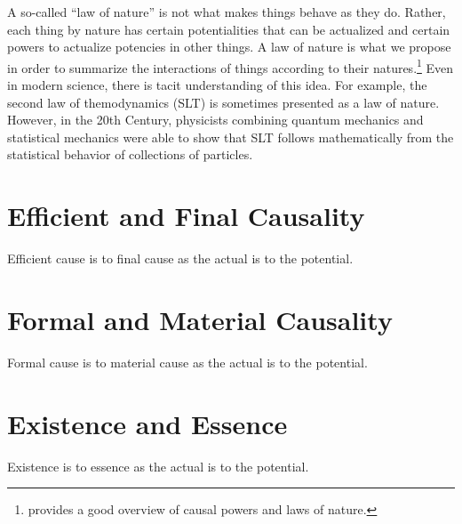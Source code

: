 \documentclass[twocolumn]{article}
\begin{document}
A so-called ``law of nature'' is not what makes things behave as they do.
Rather, each thing by nature has certain potentialities that can be actualized
and certain powers to actualize potencies in other things.  A law of nature is
what we propose in order to summarize the interactions of things according to
their natures.\footnote{%
   \citet[Section 1.2.2.4]{f2014} provides a good overview of causal powers and
   laws of nature.
}
Even in modern science, there is tacit understanding of this idea. For example,
the second law of themodynamics (SLT) is sometimes presented as a law of
nature.  However, in the 20th Century, physicists combining quantum mechanics
and statistical mechanics were able to show that SLT follows mathematically
from the statistical behavior of collections of particles.

\section{Efficient and Final Causality}

Efficient cause is to final cause as the actual is to the potential.

\section{Formal and Material Causality}

Formal cause is to material cause as the actual is to the potential.

\section{Existence and Essence}

Existence is to essence as the actual is to the potential.


\end{document}
